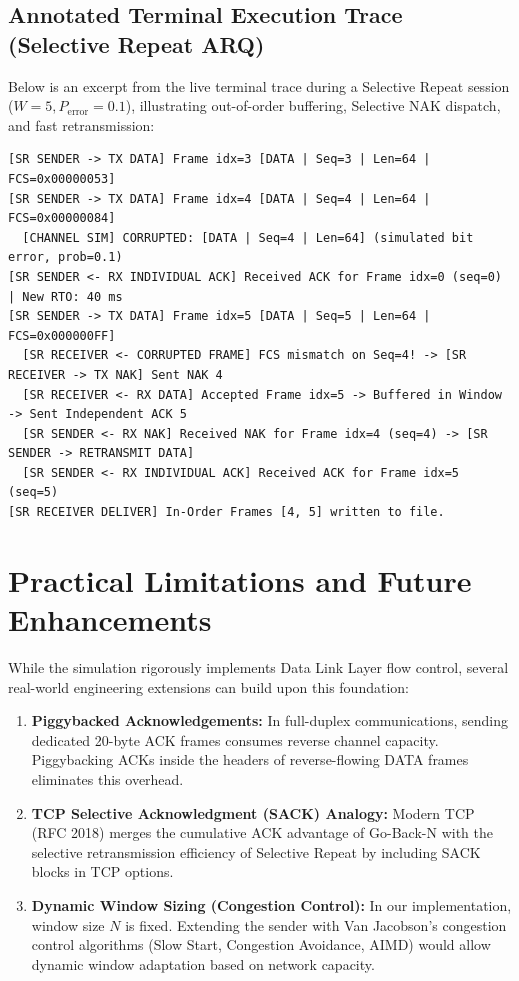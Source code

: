 \documentclass[11pt,a4paper]{article}
\begin{document}
\subsection{Annotated Terminal Execution Trace (Selective Repeat ARQ)}
Below is an excerpt from the live terminal trace during a Selective Repeat session ($W=5, P_{\text{error}}=0.1$), illustrating out-of-order buffering, Selective NAK dispatch, and fast retransmission:
\begin{lstlisting}[caption={Selective Repeat Live Trace Excerpt}]
[SR SENDER -> TX DATA] Frame idx=3 [DATA | Seq=3 | Len=64 | FCS=0x00000053]
[SR SENDER -> TX DATA] Frame idx=4 [DATA | Seq=4 | Len=64 | FCS=0x00000084]
  [CHANNEL SIM] CORRUPTED: [DATA | Seq=4 | Len=64] (simulated bit error, prob=0.1)
[SR SENDER <- RX INDIVIDUAL ACK] Received ACK for Frame idx=0 (seq=0) | New RTO: 40 ms
[SR SENDER -> TX DATA] Frame idx=5 [DATA | Seq=5 | Len=64 | FCS=0x000000FF]
  [SR RECEIVER <- CORRUPTED FRAME] FCS mismatch on Seq=4! -> [SR RECEIVER -> TX NAK] Sent NAK 4
  [SR RECEIVER <- RX DATA] Accepted Frame idx=5 -> Buffered in Window -> Sent Independent ACK 5
  [SR SENDER <- RX NAK] Received NAK for Frame idx=4 (seq=4) -> [SR SENDER -> RETRANSMIT DATA]
  [SR SENDER <- RX INDIVIDUAL ACK] Received ACK for Frame idx=5 (seq=5)
[SR RECEIVER DELIVER] In-Order Frames [4, 5] written to file.
\end{lstlisting}

\FloatBarrier
\section{Practical Limitations and Future Enhancements}

While the simulation rigorously implements Data Link Layer flow control, several real-world engineering extensions can build upon this foundation:
\begin{enumerate}
    \item \textbf{Piggybacked Acknowledgements:} In full-duplex communications, sending dedicated 20-byte ACK frames consumes reverse channel capacity. Piggybacking ACKs inside the headers of reverse-flowing DATA frames eliminates this overhead.
    \item \textbf{TCP Selective Acknowledgment (SACK) Analogy:} Modern TCP (RFC 2018) merges the cumulative ACK advantage of Go-Back-N with the selective retransmission efficiency of Selective Repeat by including SACK blocks in TCP options.
    \item \textbf{Dynamic Window Sizing (Congestion Control):} In our implementation, window size $N$ is fixed. Extending the sender with Van Jacobson's congestion control algorithms (Slow Start, Congestion Avoidance, AIMD) would allow dynamic window adaptation based on network capacity.
\end{enumerate}
\end{document}
